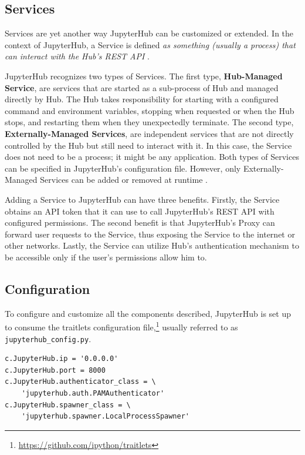 \documentclass[
  digital,     %
  oneside,     %
  nosansbold,  %
  nocolorbold, %
  lof,         %
  nolot,         %
]{fithesis4}
\newenvironment{code}{\captionsetup{type=listing}}{}
\begin{document}
\subsection{Services}
\label{subsec:jupyterhub:services}
Services are yet another way JupyterHub can be customized or extended. In the context of JupyterHub, a Service is defined \emph{as something (usually a process) that can interact with the Hub's REST API} \cite{jupyterhub_service}.

JupyterHub recognizes two types of Services. The first type, \textbf{Hub-Managed Service}, are services that are started as a sub-process of Hub and managed directly by Hub. The Hub takes responsibility for starting with a configured command and environment variables, stopping when requested or when the Hub stops, and restarting them when they unexpectedly terminate. The second type, \textbf{Externally-Managed Services}, are independent services that are not directly controlled by the Hub but still need to interact with it. In this case, the Service does not need to be a process; it might be any application. Both types of Services can be specified in JupyterHub's configuration file. However, only Externally-Managed Services can be added or removed at runtime \cite{jupyterhub_service}.

Adding a Service to JupyterHub can have three benefits. Firstly, the Service obtains an API token that it can use to call JupyterHub's REST API with configured permissions. The second benefit is that JupyterHub's Proxy can forward user requests to the Service, thus exposing the Service to the internet or other networks. Lastly, the Service can utilize Hub's authentication mechanism to be accessible only if the user's permissions allow him to.

\subsection{Configuration}
\label{subsec:jupyterhub:configuration}

To configure and customize all the components described, JupyterHub is set up to consume the traitlets configuration file,\footnote{\url{https://github.com/ipython/traitlets}} usually referred to as \texttt{jupyterhub\_config.py}.

\begin{code}
\label{lst:jupyterhub:config}
\begin{verbatim}
c.JupyterHub.ip = '0.0.0.0'
c.JupyterHub.port = 8000 
c.JupyterHub.authenticator_class = \ 
    'jupyterhub.auth.PAMAuthenticator'
c.JupyterHub.spawner_class = \
    'jupyterhub.spawner.LocalProcessSpawner'
\end{verbatim}
\end{code}
\end{document}
